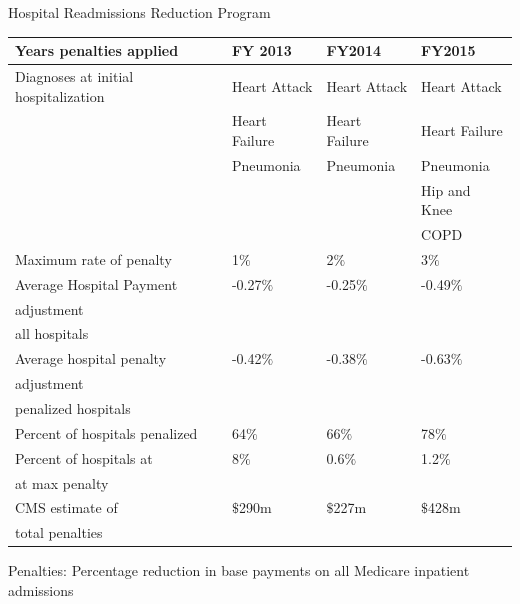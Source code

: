 \documentclass[ucs,9pt]{beamer}
\begin{document}
\begin{frame}{Hospital Readmissions Reduction Program}
\begin{table}
\centering
\footnotesize
\begin{tabular}{llll}
\hline \hline
Years penalties applied & FY 2013 & FY2014 & FY2015 \\
\hline
Diagnoses at initial hospitalization & Heart Attack & Heart Attack & Heart Attack \\
						     & Heart Failure & Heart Failure & Heart Failure \\
						     & Pneumonia & Pneumonia & Pneumonia \\
						     & 			&			& Hip and Knee \\
						     &			&			& COPD \\
\hline
Maximum rate of penalty		& 1$\%$ & 2$\%$ & 3$\%$ \\
Average Hospital Payment	& -0.27$\%$ & -0.25$\%$ & -0.49$\%$ \\
\hspace{0.1in} adjustment 	&&& \\
\hspace{0.1in} all hospitals	&&& \\
Average hospital penalty		& -0.42$\%$ & -0.38$\%$ & -0.63$\%$ \\
\hspace{0.1in} adjustment 	&&& \\
\hspace{0.1in} penalized hospitals	&&& \\
Percent of hospitals penalized & 64$\%$ & 66$\%$ & 78$\%$ \\
Percent of hospitals at		&8$\%$ & 0.6$\%$ & 1.2$\%$ \\
\hspace{0.1in} at max penalty	&&& \\
CMS estimate of 			& $\$$290m & $\$$227m & $\$$428m \\
\hspace{0.1in} total penalties &&&\\
\hline
\end{tabular}
\end{table}
\small Penalties: Percentage reduction in base payments on all Medicare inpatient admissions
\end{frame}
\end{document}
